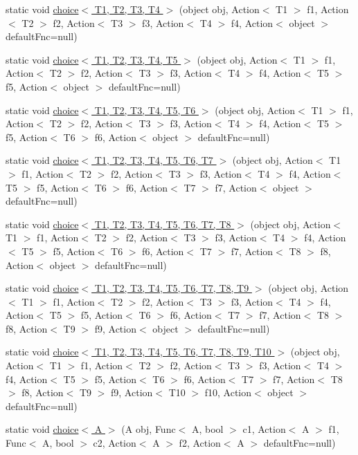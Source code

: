 \begin{DoxyCompactItemize}
static void \hyperlink{class_prelude_a794c6e8da5e65534768d009f8902afd4}{choice$<$ T1, T2, T3, T4 $>$} (object obj, Action$<$ T1 $>$ f1, Action$<$ T2 $>$ f2, Action$<$ T3 $>$ f3, Action$<$ T4 $>$ f4, Action$<$ object $>$ default\+Fnc=null)
\item 
static void \hyperlink{class_prelude_aba73faf1e35fb6ed0c8f61dd55d0f050}{choice$<$ T1, T2, T3, T4, T5 $>$} (object obj, Action$<$ T1 $>$ f1, Action$<$ T2 $>$ f2, Action$<$ T3 $>$ f3, Action$<$ T4 $>$ f4, Action$<$ T5 $>$ f5, Action$<$ object $>$ default\+Fnc=null)
\item 
static void \hyperlink{class_prelude_a21e24f653010876d5777d5a5fe47a306}{choice$<$ T1, T2, T3, T4, T5, T6 $>$} (object obj, Action$<$ T1 $>$ f1, Action$<$ T2 $>$ f2, Action$<$ T3 $>$ f3, Action$<$ T4 $>$ f4, Action$<$ T5 $>$ f5, Action$<$ T6 $>$ f6, Action$<$ object $>$ default\+Fnc=null)
\item 
static void \hyperlink{class_prelude_a6cb43b8616c7e1e5a5506c2044f2a977}{choice$<$ T1, T2, T3, T4, T5, T6, T7 $>$} (object obj, Action$<$ T1 $>$ f1, Action$<$ T2 $>$ f2, Action$<$ T3 $>$ f3, Action$<$ T4 $>$ f4, Action$<$ T5 $>$ f5, Action$<$ T6 $>$ f6, Action$<$ T7 $>$ f7, Action$<$ object $>$ default\+Fnc=null)
\item 
static void \hyperlink{class_prelude_a5aa9d09a374433b1dfdcb9097f45d3a5}{choice$<$ T1, T2, T3, T4, T5, T6, T7, T8 $>$} (object obj, Action$<$ T1 $>$ f1, Action$<$ T2 $>$ f2, Action$<$ T3 $>$ f3, Action$<$ T4 $>$ f4, Action$<$ T5 $>$ f5, Action$<$ T6 $>$ f6, Action$<$ T7 $>$ f7, Action$<$ T8 $>$ f8, Action$<$ object $>$ default\+Fnc=null)
\item 
static void \hyperlink{class_prelude_a1a3d913bc3f6ab24135805dc1e44ec11}{choice$<$ T1, T2, T3, T4, T5, T6, T7, T8, T9 $>$} (object obj, Action$<$ T1 $>$ f1, Action$<$ T2 $>$ f2, Action$<$ T3 $>$ f3, Action$<$ T4 $>$ f4, Action$<$ T5 $>$ f5, Action$<$ T6 $>$ f6, Action$<$ T7 $>$ f7, Action$<$ T8 $>$ f8, Action$<$ T9 $>$ f9, Action$<$ object $>$ default\+Fnc=null)
\item 
static void \hyperlink{class_prelude_ac80961039eff79d7202317a153b0799d}{choice$<$ T1, T2, T3, T4, T5, T6, T7, T8, T9, T10 $>$} (object obj, Action$<$ T1 $>$ f1, Action$<$ T2 $>$ f2, Action$<$ T3 $>$ f3, Action$<$ T4 $>$ f4, Action$<$ T5 $>$ f5, Action$<$ T6 $>$ f6, Action$<$ T7 $>$ f7, Action$<$ T8 $>$ f8, Action$<$ T9 $>$ f9, Action$<$ T10 $>$ f10, Action$<$ object $>$ default\+Fnc=null)
\item 
static void \hyperlink{class_prelude_abd59b2ae27a3b28ab3d44c543ee874bf}{choice$<$ A $>$} (A obj, Func$<$ A, bool $>$ c1, Action$<$ A $>$ f1, Func$<$ A, bool $>$ c2, Action$<$ A $>$ f2, Action$<$ A $>$ default\+Fnc=null)

\end{DoxyCompactItemize}
